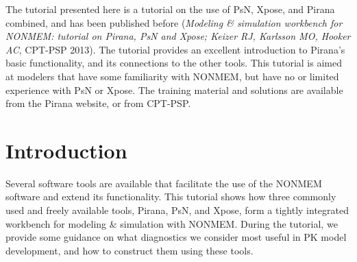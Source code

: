 
\begin{center}
   {\colorbox{grey2}{
         \begin{minipage}[t]{0.9\textwidth}
The tutorial presented here is a tutorial on the use of PsN,
Xpose, and Pirana combined, and has been published before (\textit{\small Modeling \& 
simulation workbench for NONMEM: tutorial on Pirana, PsN and Xpose; Keizer RJ, Karlsson MO, Hooker AC}\normalsize, CPT-PSP 2013). 
The tutorial provides an excellent introduction to Pirana's basic
functionality, and its connections to the other tools. This
tutorial is aimed at modelers that have some familiarity
with NONMEM, but have no or limited experience with PsN or Xpose. The
training material and solutions are available from the Pirana website, or from CPT-PSP.
          \end{minipage}
      }
   }
\end{center}

\section{Introduction}
Several software tools are available that
facilitate the use of the NONMEM software and extend its
functionality. This tutorial shows how three commonly used and freely
available tools, Pirana, PsN, and Xpose, form a tightly integrated
workbench for modeling \& simulation with NONMEM. During the tutorial,
we provide some guidance on what diagnostics we consider most useful
in PK model development, and how to construct them using these
tools. 

